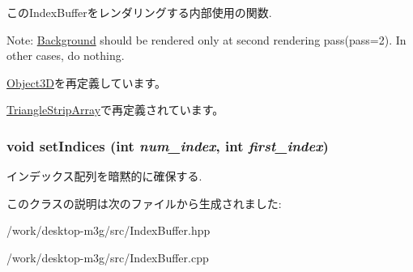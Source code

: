 このIndexBufferをレンダリングする内部使用の関数.

Note: \hyperlink{classm3g_1_1Background}{Background} should be rendered only at second rendering pass(pass=2). In other cases, do nothing. 

\hyperlink{classm3g_1_1Object3D_1efcb1973989d9963d5bd6d03065d389}{Object3D}を再定義しています。

\hyperlink{classm3g_1_1TriangleStripArray_1efcb1973989d9963d5bd6d03065d389}{TriangleStripArray}で再定義されています。\hypertarget{classm3g_1_1IndexBuffer_26c5b78691f0f92bd8589714cc25b6a8}{
\subsubsection[{setIndices}]{\setlength{\rightskip}{0pt plus 5cm}void setIndices (int {\em num\_\-index}, \/  int {\em first\_\-index})}}
\label{classm3g_1_1IndexBuffer_26c5b78691f0f92bd8589714cc25b6a8}


インデックス配列を暗黙的に確保する. 

このクラスの説明は次のファイルから生成されました:\begin{CompactItemize}
\item 
/work/desktop-m3g/src/IndexBuffer.hpp\item 
/work/desktop-m3g/src/IndexBuffer.cpp\end{CompactItemize}
